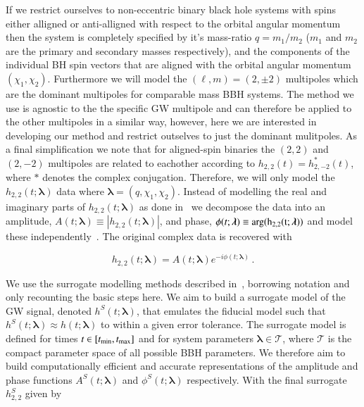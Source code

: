 \documentclass[aps,prd,reprint,superscriptaddress,preprintnumbers,showpacs,nofootinbib]{revtex4-1}
\begin{document}
If we restrict ourselves to non-eccentric binary black
hole systems with spins either alligned or anti-alligned with respect to the
orbital angular momentum then the system is completely specified by it's
mass-ratio $q = m_1/m_2$ ($m_1$ and $m_2$ are the primary and secondary masses
respectively), and the components of the individual BH spin vectors that are
aligned with the orbital angular momentum $(\chi_{1}, \chi_{2})$. Furthermore we
will model the $(\ell, m) = (2,\pm 2)$ multipoles which are the dominant
multipoles for comparable mass BBH systems. The method we use is agnostic to the
the specific GW multipole and can therefore be applied to the other multipoles
in a similar way, however, here we are interested in developing our method and
restrict outselves to just the dominant mulitpoles. As a final simplification we
note that for aligned-spin binaries the $(2,2)$ and $(2, -2)$ multipoles are
related to eachother according to $h_{2,2}(t) = h^{*}_{2, -2}(t)$, where $*$
denotes the complex conjugation. Therefore, we will only model the $h_{2,2}(t;
\boldsymbol{\lambda})$ data where $\boldsymbol{\lambda} = (q, \chi_{1},
\chi_{2})$. Instead of modelling the real and imaginary parts of
$h_{2,2}(t;\boldsymbol{\lambda})$ as done in~\cite{PhysRevLett.122.211101} we
decompose the data into an amplitude, $A(t;\boldsymbol{\lambda}) \equiv
|h_{2,2}(t;\boldsymbol{\lambda})|$, and phase, $\phi(t;\boldsymbol{\lambda})
\equiv \rm{arg}(h_{2,2}(t;\boldsymbol{\lambda}))$ and model these
independently~\cite{PhysRevX.4.031006}. The original complex data is recovered
with

\begin{equation}
h_{2,2}(t;\boldsymbol{\lambda}) = A(t;\boldsymbol{\lambda}) e^{-i
\phi(t;\boldsymbol{\lambda})} \, .
\end{equation}

We use the surrogate modelling methods described in~\cite{PhysRevX.4.031006,
PhysRevD.95.104023}, borrowing notation and only recounting the basic steps
here. We aim to build a surrogate model of the GW signal, denoted $h^{S}(t;
\boldsymbol{\lambda})$, that emulates the fiducial model such that $h^{S}(t;
\boldsymbol{\lambda}) \approx h(t; \boldsymbol{\lambda})$ to within a given
error tolerance. The surrogate model is defined for times $t \in [t_{\rm{min}},
t_{\rm{max}}]$ and for system parameters $\boldsymbol{\lambda} \in \mathcal{T}$,
where $\mathcal{T}$ is the compact parameter space of all possible BBH
parameters. We therefore aim to build computationally efficient and accurate
representations of the amplitude and phase functions
$A^{S}(t;\boldsymbol{\lambda})$ and $\phi^{S}(t;\boldsymbol{\lambda})$
respectively. With the final surrogate $h_{2,2}^{S}$ given by
\end{document}
